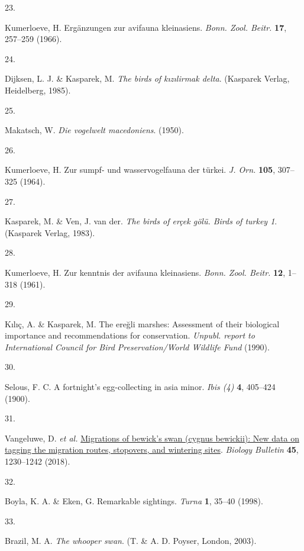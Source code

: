 \documentclass[
  letterpaper,
  DIV=11,
  numbers=noendperiod]{scrreprt}
\newlength{\cslhangindent}
\newlength{\csllabelwidth}
\newenvironment{CSLReferences}[2] %
 {\begin{list}{}{%
  \setlength{\itemindent}{0pt}
  \setlength{\leftmargin}{0pt}
  \setlength{\parsep}{0pt}
  \ifodd #1
   \setlength{\leftmargin}{\cslhangindent}
   \setlength{\itemindent}{-1\cslhangindent}
  \fi
  \setlength{\itemsep}{#2\baselineskip}}}
 {\end{list}}
\newcommand{\CSLLeftMargin}[1]{\parbox[t]{\csllabelwidth}{\strut#1\strut}}
\newcommand{\CSLRightInline}[1]{\parbox[t]{\linewidth - \csllabelwidth}{\strut#1\strut}}
\begin{document}
\begin{CSLReferences}{0}{0}
\CSLLeftMargin{23. }%
\CSLRightInline{Kumerloeve, H. Ergänzungen zur avifauna kleinasiens.
\emph{Bonn. Zool. Beitr.} \textbf{17}, 257--259 (1966).}

\CSLLeftMargin{24. }%
\CSLRightInline{Dijksen, L. J. \& Kasparek, M. \emph{The birds of
kızılirmak delta}. (Kasparek Verlag, Heidelberg, 1985).}

\CSLLeftMargin{25. }%
\CSLRightInline{Makatsch, W. \emph{Die vogelwelt macedoniens}. (1950).}

\CSLLeftMargin{26. }%
\CSLRightInline{Kumerloeve, H. Zur sumpf- und wasservogelfauna der
türkei. \emph{J. Orn.} \textbf{105}, 307--325 (1964).}

\CSLLeftMargin{27. }%
\CSLRightInline{Kasparek, M. \& Ven, J. van der. \emph{The birds of
erçek gölü. Birds of turkey 1}. (Kasparek Verlag, 1983).}

\CSLLeftMargin{28. }%
\CSLRightInline{Kumerloeve, H. Zur kenntnis der avifauna kleinasiens.
\emph{Bonn. Zool. Beitr.} \textbf{12}, 1--318 (1961).}

\CSLLeftMargin{29. }%
\CSLRightInline{Kılıç, A. \& Kasparek, M. The ereğli marshes: Assessment
of their biological importance and recommendations for conservation.
\emph{Unpubl. report to International Council for Bird
Preservation/World Wildlife Fund} (1990).}

\CSLLeftMargin{30. }%
\CSLRightInline{Selous, F. C. A fortnight's egg-collecting in asia
minor. \emph{Ibis (4)} \textbf{4}, 405--424 (1900).}

\CSLLeftMargin{31. }%
\CSLRightInline{Vangeluwe, D. \emph{et al.}
\href{https://doi.org/10.1134/S1062359018070178}{Migrations of bewick's
swan (cygnus bewickii): New data on tagging the migration routes,
stopovers, and wintering sites}. \emph{Biology Bulletin} \textbf{45},
1230--1242 (2018).}

\CSLLeftMargin{32. }%
\CSLRightInline{Boyla, K. A. \& Eken, G. Remarkable sightings.
\emph{Turna} \textbf{1}, 35--40 (1998).}

\CSLLeftMargin{33. }%
\CSLRightInline{Brazil, M. A. \emph{The whooper swan}. (T. \& A. D.
Poyser, London, 2003).}


\end{CSLReferences}
\end{document}
